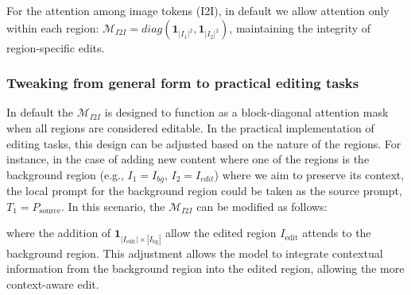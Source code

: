 \documentclass{article}
\begin{document}
For the attention among image tokens (I2I), in default we allow attention only within each region: $\mathcal{M}_{I2I}=diag(\mathbf{1}_{|I_1|^2}, \mathbf{1}_{|I_2|^2})$, maintaining the integrity of region-specific edits.

\subsubsection{Tweaking from general form to practical editing tasks}




In default the $\mathcal{M}_{I2I}$ is designed to function as a block-diagonal attention mask when all regions are considered editable. In the practical implementation of editing tasks, this design can be adjusted based on the nature of the regions. For instance, in the case of adding new content where one of the regions is the background region (e.g., $I_1=I_{bg}$, $I_2=I_{edit}$) where we aim to preserve its context, the local prompt for the background region could be taken as the source prompt, $T_1=P_\text{source}$. In this scenario, the $\mathcal{M}_{I2I}$ can be modified as follows:


where the addition of $\mathbf{1}_{|I_\text{edit}|\times|I_\text{bg}|}$ allow the edited region $I_\text{edit}$ attends to the background region. This adjustment allows the model to integrate contextual information from the background region into the edited region, allowing the more context-aware edit. 
\end{document}
